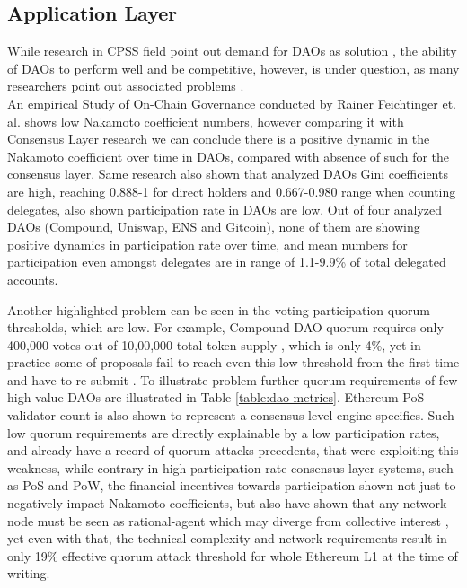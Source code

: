 \documentclass{article}
\begin{document}
\begin{CJK}{UTF8}{gbsn}
\begin{multicols}{2}
        \subsection{Application Layer}
        While research in CPSS field point out demand for DAOs as solution \cite{Fei2016}\cite{Wang2022}\cite{Juanjuan2023}, the ability of DAOs to perform well and be competitive, however, is under question, as many researchers point out associated problems \cite{Rainer2023}\cite{Marcella2016}\cite{Xuan2024}.  \\An empirical Study of On-Chain Governance conducted by Rainer Feichtinger et. al. \cite{Rainer2023} shows low Nakamoto coefficient numbers, however comparing it with Consensus Layer research \cite{Dominic2023} we can conclude there is a positive dynamic in the Nakamoto coefficient over time in DAOs, compared with absence of such for the consensus layer. Same research\cite{Rainer2023} also shown that analyzed DAOs Gini coefficients\cite{Lidia2012} are high, reaching 0.888-1 for direct holders and 0.667-0.980 range when counting delegates, also shown participation rate in DAOs are low. Out of four analyzed DAOs (Compound, Uniswap, ENS and Gitcoin), none of them are showing positive dynamics in participation rate over time, and mean numbers for participation even amongst delegates are in range of 1.1-9.9\% of total delegated accounts.


        Another highlighted problem can be seen in the voting participation quorum thresholds, which are low. For example, Compound DAO quorum requires only 400,000 \cite{CompDAO} votes out of 10,00,000 total token supply \cite{CompToken}, which is only 4\%, yet in practice some of proposals fail to reach even this low threshold from the first time and have to re-submit \cite{CompProp232}\cite{CompProp237}. To illustrate problem further quorum requirements of few high value DAOs are illustrated in Table \ref*{table:dao-metrics}. Ethereum PoS validator count is also shown to represent a consensus level engine specifics. Such low quorum requirements are directly explainable by a low participation rates, and already have a record of quorum attacks \cite{AragonBlog}\cite{rhizoo2023} precedents, that were exploiting this weakness, while contrary in high participation rate consensus layer systems, such as PoS and PoW, the financial incentives towards participation shown not just to negatively impact  Nakamoto coefficients, but also have shown that any network node must be seen as rational-agent which may diverge from collective interest \cite{Philip2019}, yet even with that, the technical complexity and network requirements result in only 19\% effective quorum attack threshold for whole Ethereum L1 at the time of writing.
            

\end{multicols}
\end{CJK}
\end{document}
